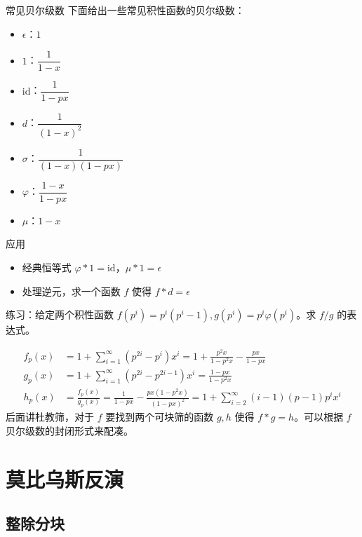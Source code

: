 \documentclass [hyperref={bookmarksdepth=4}, aspectratio=169] {beamer}
\theoremstyle {fy}
\begin{document}
\begin{frame}{常见贝尔级数}
下面给出一些常见积性函数的贝尔级数：

\begin{itemize}
    \item $\epsilon$：$1$
    \item $1$：$\dfrac{1}{1-x}$
    \item $\text{id}$：$\dfrac{1}{1-px}$
    \item $d$：$\dfrac{1}{(1-x)^2}$
    \item $\sigma$：$\dfrac{1}{(1-x)(1-px)}$
    \item $\varphi$：$\dfrac{1-x}{1-px}$
    \item $\mu$：$1-x$
\end{itemize}
\end{frame}

\begin{frame}{应用}
\begin{itemize}
    \item 经典恒等式 $\varphi*1=\text{id}$，$\mu*1=\epsilon$
    \item 处理逆元，求一个函数 $f$ 使得 $f*d=\epsilon$
\end{itemize}

练习：给定两个积性函数 $f(p^i)=p^i(p^i-1),g(p^i)=p^i\varphi(p^i)$。求 $f/g$ 的表达式。

$$
\begin{aligned}
f_p(x)&=1+\sum_{i=1}^{\infty}(p^{2i}-p^i)x^i=1+\frac{p^2x}{1-p^2x}-\frac{px}{1-px}\\
g_p(x)&=1+\sum_{i=1}^{\infty}(p^{2i}-p^{2i-1})x^i=\frac{1-px}{1-p^2x}\\
h_p(x)&=\frac{f_p(x)}{g_p(x)}=\frac{1}{1-px}-\frac{px(1-p^2x)}{(1-px)^2}=1+\sum_{i=2}^{\infty}(i-1)(p-1)p^ix^i
\end{aligned}
$$
后面讲杜教筛，对于 $f$ 要找到两个可块筛的函数 $g,h$ 使得 $f*g=h$。可以根据 $f$ 贝尔级数的封闭形式来配凑。
\end{frame}

\section{莫比乌斯反演}

\subsection{整除分块}
\end{document}
